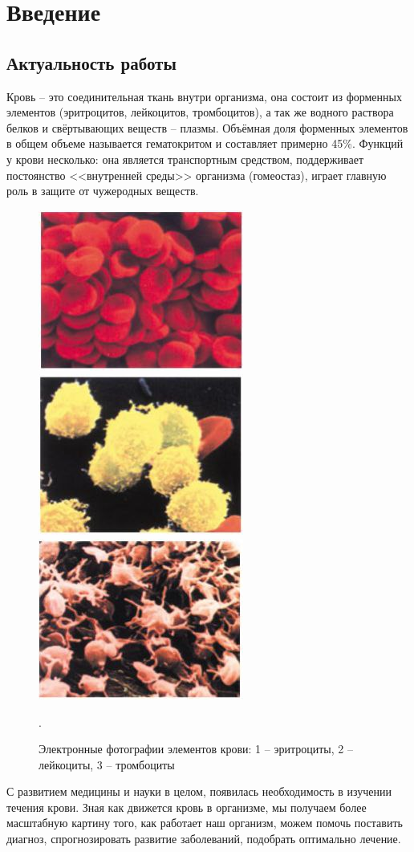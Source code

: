 \section{Введение}
\subsection{Актуальность работы}
Кровь -- это соединительная ткань внутри организма, она состоит из форменных элементов (эритроцитов, лейкоцитов, тромбоцитов), 
а так же водного раствора белков и свёртывающих веществ -- плазмы. Объёмная доля форменных элементов в общем объеме называется 
гематокритом и составляет примерно 45\%.
Функций у крови несколько: она является транспортным средством, поддерживает постоянство <<внутренней среды>> организма (гомеостаз), 
играет главную роль в защите от чужеродных веществ.

\begin{figure}[h]
\centering
\includegraphics[width=0.3\linewidth]{erotr.jpg}
\includegraphics[width=0.3\linewidth]{leiko.jpg}
\includegraphics[width=0.3\linewidth]{trombo.jpg}
\caption{ Электронные фотографии элементов крови: 1 -- эритроциты, 2 -- лейкоциты, 3 -- тромбоциты~\cite{rls:2003}}.
\label{fig:mpr}
\end{figure}
С развитием медицины и науки в целом, появилась необходимость в изучении течения крови. Зная как движется кровь в организме, 
мы получаем более масштабную картину того, как работает наш организм, можем помочь поставить диагноз, спрогнозировать развитие 
заболеваний, подобрать оптимально лечение.

